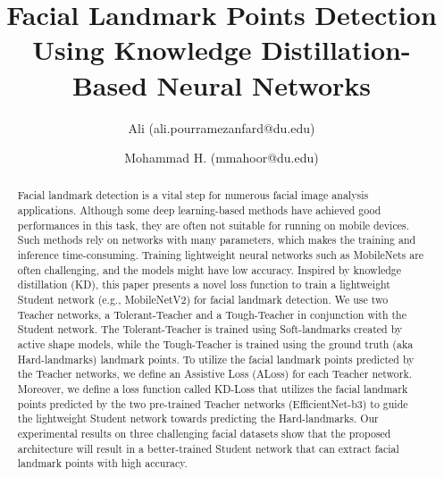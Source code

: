 \documentclass[times,twocolumn,final,authoryear]{elsarticle}
\begin{document}
\ifpreprint
  \setcounter{page}{1}
\else
  \setcounter{page}{1}
\fi

\begin{frontmatter}

\title{Facial Landmark Points Detection Using Knowledge Distillation-Based Neural Networks}

\author{Ali  (ali.pourramezanfard@du.edu)} 

\author{Mohammad H.  (mmahoor@du.edu)}

\address{Department of Electrical and Computer Engineering, University of Denver, 2155 E Wesley Ave, Denver 80208, USA}


\begin{abstract}
Facial landmark detection is a vital step for numerous facial image analysis applications. Although some deep learning-based methods have achieved good performances in this task, they are often not suitable for running on mobile devices. Such methods rely on networks with many parameters, which makes the training and inference time-consuming. Training lightweight neural networks such as MobileNets are often challenging, and the models might have low accuracy. Inspired by knowledge distillation (KD), this paper presents a novel loss function to train a lightweight Student network (e.g., MobileNetV2) for facial landmark detection. We use two Teacher networks, a Tolerant-Teacher and a Tough-Teacher in conjunction with the Student network. The Tolerant-Teacher is trained using Soft-landmarks created by active shape models, while the Tough-Teacher is trained using the ground truth (aka Hard-landmarks) landmark points. To utilize the facial landmark points predicted by the Teacher networks, we define an Assistive Loss (ALoss) for each Teacher network. Moreover, we define a loss function called KD-Loss that utilizes the facial landmark points predicted by the two pre-trained Teacher networks (EfficientNet-b3) to guide the lightweight Student network towards predicting the Hard-landmarks. Our experimental results on three challenging facial datasets show that the proposed architecture will result in a better-trained Student network that can extract facial landmark points with high accuracy. 

\end{abstract}

\end{frontmatter}
\end{document}

